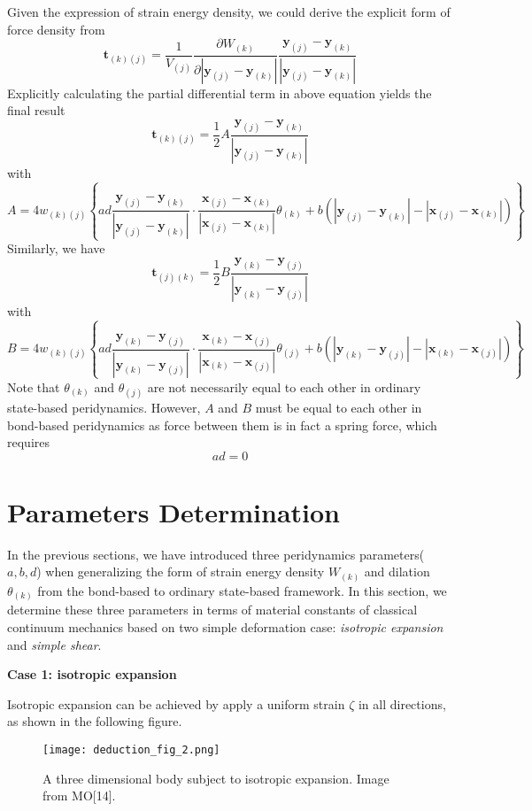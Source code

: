 \documentclass[a4paper,11pt,CJK]{paper}
\newcommand{\bfxj}{\textbf{x}_{(j)}}
\newcommand{\bfyj}{\textbf{y}_{(j)}}
\newcommand{\bfxk}{\textbf{x}_{(k)}}
\newcommand{\bfyk}{\textbf{y}_{(k)}}
\newcommand{\wkj}{w_{(k)(j)}}
\newcommand{\tkj}{\textbf{t}_{(k)(j)}}
\newcommand{\tjk}{\textbf{t}_{(j)(k)}}
\newcommand{\thetak}{\theta_{(k)}}
\begin{document}
Given the expression of strain energy density, we could derive the explicit form of force density from
\begin{equation}
\tkj = \frac{1}{V_{(j)}}\frac{\partial W_{(k)}}{\partial |\bfyj-\bfyk|}\frac{\bfyj - \bfyk}{|\bfyj - \bfyk|}
\end{equation}
Explicitly calculating the partial differential term in above equation yields the final result
\begin{equation}
\tkj = \frac{1}{2}A\frac{\bfyj - \bfyk}{|\bfyj - \bfyk|}
\end{equation}
with
\begin{equation}
A = 4\wkj\left\{ad\frac{\bfyj-\bfyk}{|\bfyj-\bfyk|}\cdot\frac{\bfxj-\bfxk}{|\bfxj-\bfxk|}\thetak
   +b\left(|\bfyj - \bfyk| - |\bfxj - \bfxk|\right) \right\}
\end{equation}
Similarly, we have
\begin{equation}
\tjk = \frac{1}{2}B\frac{\bfyk - \bfyj}{|\bfyk - \bfyj|}
\end{equation}
with
\begin{equation}
B= 4\wkj\left\{ad\frac{\bfyk-\bfyj}{|\bfyk-\bfyj|}\cdot\frac{\bfxk-\bfxj}{|\bfxk-\bfxj|}\theta_{(j)}
   +b\left(|\bfyk - \bfyj| - |\bfxk - \bfxj|\right) \right\}
\end{equation}
Note that $\thetak$ and $\theta_{(j)}$ are not necessarily equal to each other in ordinary state-based peridynamics.
However, $A$ and $B$ must be equal to each other in bond-based peridynamics as force between them is in fact a spring force, which requires
\begin{equation}
ad = 0
\end{equation}
\section{Parameters Determination}
In the previous sections, we have introduced three peridynamics parameters($a,b,d$) when generalizing the form of strain energy density $W_{(k)}$ and dilation $\thetak$ from the bond-based to ordinary state-based framework.
In this section, we determine these three parameters in terms of material constants of classical continuum mechanics based on two simple deformation case: \textit{isotropic expansion} and \textit{simple shear}.

\textbf{Case 1: isotropic expansion}

Isotropic expansion can be achieved by apply a uniform strain $\zeta$ in all directions, as shown in the following figure.
\begin{figure}[!h]
\center
\texttt{[image: deduction\_fig\_2.png]}
\caption{A three dimensional body subject to isotropic expansion. Image from MO[14].}
\end{figure}
\end{document}
